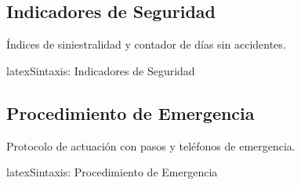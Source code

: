 \begin{epilist}
  \item \epihardhat
  \item \epigloves
  \item \epigoggles
  \item \epiboots
  \item \epimask
  \item \epiearprotection
  \item \epivest
  \item \epiharness
\end{epilist}

\subsection{Indicadores de Seguridad}
\label{subsec:indicadores-seguridad}

Índices de siniestralidad y contador de días sin accidentes.

\begin{codigosimple}{latex}{Sintaxis: Indicadores de Seguridad}
\end{codigosimple}

\noindent
{}
\hfill
{}
\hfill
{}
\hfill
{}

\subsection{Procedimiento de Emergencia}
\label{subsec:emergencia}

Protocolo de actuación con pasos y teléfonos de emergencia.

\begin{codigosimple}{latex}{Sintaxis: Procedimiento de Emergencia}
\begin{emergencyprocedure}[Título]
\end{emergencyprocedure}
\end{codigosimple}

